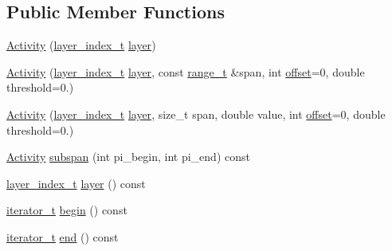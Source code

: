\subsection*{Public Member Functions}
\begin{DoxyCompactItemize}
\item 
\hyperlink{class_wire_cell_1_1_ray_grid_1_1_activity_aed4ac25a6f5ce1a5933b04f04858597e}{Activity} (\hyperlink{namespace_wire_cell_1_1_ray_grid_ab7562e54b58eede813d5b70b5eb85812}{layer\+\_\+index\+\_\+t} \hyperlink{class_wire_cell_1_1_ray_grid_1_1_activity_a871b9e9a8f3d3fbc728ce1c50ef39ece}{layer})
\item 
\hyperlink{class_wire_cell_1_1_ray_grid_1_1_activity_abc20e03d0590c69828e595867a96b956}{Activity} (\hyperlink{namespace_wire_cell_1_1_ray_grid_ab7562e54b58eede813d5b70b5eb85812}{layer\+\_\+index\+\_\+t} \hyperlink{class_wire_cell_1_1_ray_grid_1_1_activity_a871b9e9a8f3d3fbc728ce1c50ef39ece}{layer}, const \hyperlink{class_wire_cell_1_1_ray_grid_1_1_activity_af70e5851ae6fb8d76415033c0f90cb3e}{range\+\_\+t} \&span, int \hyperlink{class_wire_cell_1_1_ray_grid_1_1_activity_a8c051a729c264f4ca6e91e21e6edf729}{offset}=0, double threshold=0.)
\item 
\hyperlink{class_wire_cell_1_1_ray_grid_1_1_activity_a455f994f3f4edeadcb60daab1ed10a19}{Activity} (\hyperlink{namespace_wire_cell_1_1_ray_grid_ab7562e54b58eede813d5b70b5eb85812}{layer\+\_\+index\+\_\+t} \hyperlink{class_wire_cell_1_1_ray_grid_1_1_activity_a871b9e9a8f3d3fbc728ce1c50ef39ece}{layer}, size\+\_\+t span, double value, int \hyperlink{class_wire_cell_1_1_ray_grid_1_1_activity_a8c051a729c264f4ca6e91e21e6edf729}{offset}=0, double threshold=0.)
\item 
\hyperlink{class_wire_cell_1_1_ray_grid_1_1_activity}{Activity} \hyperlink{class_wire_cell_1_1_ray_grid_1_1_activity_a0c8f129658f18402202b7c9605dfe26f}{subspan} (int pi\+\_\+begin, int pi\+\_\+end) const
\item 
\hyperlink{namespace_wire_cell_1_1_ray_grid_ab7562e54b58eede813d5b70b5eb85812}{layer\+\_\+index\+\_\+t} \hyperlink{class_wire_cell_1_1_ray_grid_1_1_activity_a871b9e9a8f3d3fbc728ce1c50ef39ece}{layer} () const
\item 
\hyperlink{class_wire_cell_1_1_ray_grid_1_1_activity_a4e6dc9c676d517a5819962b10a2638fe}{iterator\+\_\+t} \hyperlink{class_wire_cell_1_1_ray_grid_1_1_activity_abb7e7e8dd7757d7efbd31b3f85f2a69a}{begin} () const
\item 
\hyperlink{class_wire_cell_1_1_ray_grid_1_1_activity_a4e6dc9c676d517a5819962b10a2638fe}{iterator\+\_\+t} \hyperlink{class_wire_cell_1_1_ray_grid_1_1_activity_acb7cccddf07994a3bdc300dfb818dbf8}{end} () const

\end{DoxyCompactItemize}
